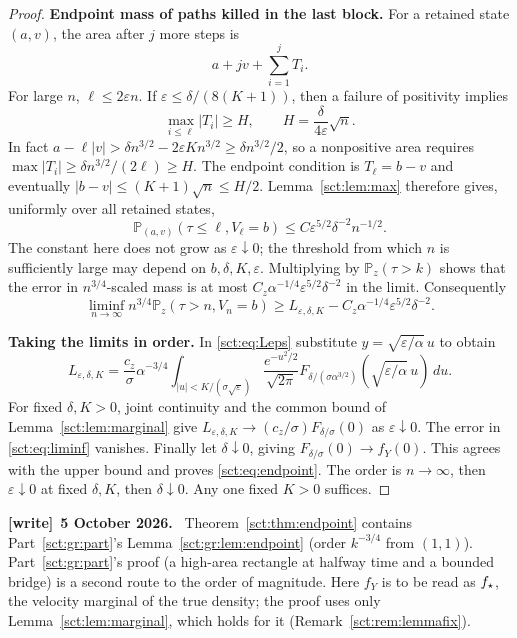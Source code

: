\documentclass[11pt,letterpaper]{article}
\theoremstyle{definition}\newtheorem{remark}[theorem]{Remark}
\newcommand{\Pp}{\mathbb P}\newcommand{\Ee}{\mathbb E}
\newcommand{\fY}{f_Y}\newcommand{\code}[1]{\texttt{#1}}
\newenvironment{writenote}[1][]{\par\smallskip\begingroup\small
 \noindent\textbf{[write]}\if\relax\detokenize{#1}\relax\else~\textbf{#1.}\fi\ }%
 {\par\endgroup\smallskip}
\begin{document}
\begin{proof}
\textbf{Endpoint mass of paths killed in the last block.}
For a retained state $(a,v)$, the area after $j$ more steps is
\[
 a+jv+\sum_{i=1}^jT_i.
\]
For large $n$, $\ell\le2\varepsilon n$. If
$\varepsilon\le\delta/(8(K+1))$, then a failure of positivity implies
\begin{equation}\label{sct:eq:H}
 \max_{i\le\ell}|T_i|\ge H,\qquad
 H=\frac{\delta}{4\varepsilon}\sqrt n.
\end{equation}
In fact $a-\ell|v|>\delta n^{3/2}-2\varepsilon Kn^{3/2}
\ge\delta n^{3/2}/2$, so a nonpositive area requires
$\max|T_i|\ge\delta n^{3/2}/(2\ell)\ge H$.
The endpoint condition is $T_\ell=b-v$ and eventually
$|b-v|\le(K+1)\sqrt n\le H/2$. Lemma~\ref{sct:lem:max} therefore gives,
uniformly over all retained states,
\begin{equation}\label{sct:eq:kill-error}
 \Pp_{(a,v)}(\tau\le\ell,V_\ell=b)
 \le C\varepsilon^{5/2}\delta^{-2}n^{-1/2}.
\end{equation}
The constant here does not grow as $\varepsilon\downarrow0$; the threshold
from which $n$ is sufficiently large may depend on $b,\delta,K,\varepsilon$.
Multiplying by $\Pp_z(\tau>k)$ shows that the error in $n^{3/4}$-scaled mass
is at most $C_z\alpha^{-1/4}\varepsilon^{5/2}\delta^{-2}$ in the limit.
Consequently
\begin{equation}\label{sct:eq:liminf}
 \liminf_{n\to\infty}n^{3/4}\Pp_z(\tau>n,V_n=b)
 \ge L_{\varepsilon,\delta,K}
      -C_z\alpha^{-1/4}\varepsilon^{5/2}\delta^{-2}.
\end{equation}

\textbf{Taking the limits in order.}
In \eqref{sct:eq:Leps} substitute $y=\sqrt{\varepsilon/\alpha}\,u$ to obtain
\[
 L_{\varepsilon,\delta,K}=\frac{c_z}{\sigma}\alpha^{-3/4}
 \int_{|u|<K/(\sigma\sqrt\varepsilon)}
 \frac{e^{-u^2/2}}{\sqrt{2\pi}}
 F_{\delta/(\sigma\alpha^{3/2})}
       (\sqrt{\varepsilon/\alpha}\,u)\,du.
\]
For fixed $\delta,K>0$, joint continuity and the common bound of
Lemma~\ref{sct:lem:marginal} give
$L_{\varepsilon,\delta,K}\to(c_z/\sigma)F_{\delta/\sigma}(0)$ as
$\varepsilon\downarrow0$. The error in \eqref{sct:eq:liminf} vanishes.
Finally let $\delta\downarrow0$, giving $F_{\delta/\sigma}(0)\to\fY(0)$.
This agrees with the upper bound and proves \eqref{sct:eq:endpoint}.
The order is $n\to\infty$, then $\varepsilon\downarrow0$ at fixed $\delta,K$,
then $\delta\downarrow0$. Any one fixed $K>0$ suffices.
\end{proof}
\begin{writenote}[5 October 2026]
Theorem~\ref{sct:thm:endpoint} contains Part~\ref{sct:gr:part}'s Lemma~\ref{sct:gr:lem:endpoint} (order $k^{-3/4}$ from $(1,1)$). Part~\ref{sct:gr:part}'s proof (a high-area rectangle at halfway time and a bounded bridge) is a second route to the order of magnitude. Here $\fY$ is to be read as $f_\star$, the velocity marginal of the true density; the proof uses only Lemma~\ref{sct:lem:marginal}, which holds for it (Remark~\ref{sct:rem:lemmafix}).
\end{writenote}
\end{document}
